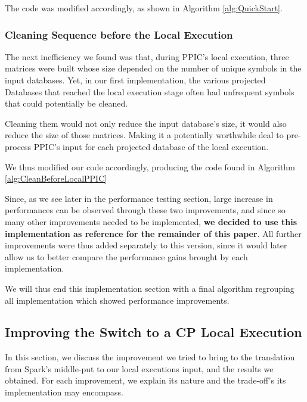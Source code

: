 \documentclass{eplmastersthesis}
\begin{document}
The code was modified accordingly, as shown in Algorithm \ref{alg:QuickStart}.

\subsubsection{Cleaning Sequence before the Local Execution}

The next inefficiency we found was that, during PPIC's local execution, three matrices were built whose size depended on the number of  unique symbols in the input databases.
Yet, in our first implementation, the various projected Databases that reached the local execution stage often had unfrequent symbols that could potentially be cleaned. \newline

Cleaning them would not only reduce the input database's size, it would also reduce the size of those matrices. Making it a potentially worthwhile deal to pre-process PPIC's input for each projected database of the local execution. \newline

We thus modified our code accordingly, producing the code found in Algorithm \ref{alg:CleanBeforeLocalPPIC} \newline

Since, as we see later in the performance testing section, large increase in performances can be observed through these two improvements, and since so many other improvements needed to be implemented, \textbf{we decided to use this implementation as reference for the remainder of this paper}. All further improvements were thus added separately to this version, since it would later allow us to better compare the performance gains brought by each implementation. \newline

We will thus end this implementation section with a final algorithm regrouping all implementation which showed performance improvements.

\subsection{Improving the Switch to a CP Local Execution}

In this section, we discuss the improvement we tried to bring to the translation from Spark's middle-put to our local executions input, and the results we obtained. For each improvement, we explain its nature and the trade-off's its implementation may encompass.
\end{document}
